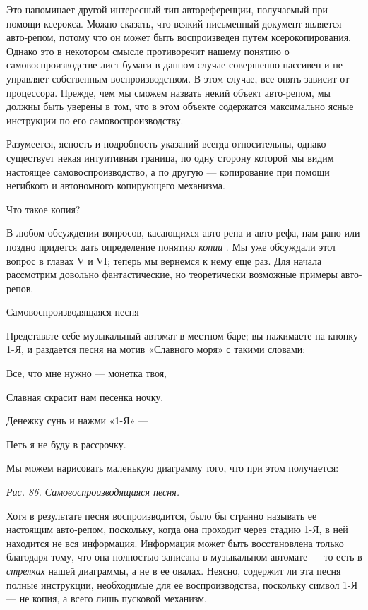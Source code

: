 Это напоминает другой интересный тип автореференции, получаемый при помощи ксерокса. Можно сказать, что всякий письменный документ является авто-репом, потому что он может быть воспроизведен путем ксерокопирования. Однако это в некотором смысле противоречит нашему понятию о самовоспроизводстве лист бумаги в данном случае совершенно пассивен и не управляет собственным воспроизводством. В этом случае, все опять зависит от процессора. Прежде, чем мы сможем назвать некий объект авто-репом, мы должны быть уверены в том, что в этом объекте содержатся максимально ясные инструкции по его самовоспроизводству.

Разумеется, ясность и подробность указаний всегда относительны, однако существует некая интуитивная граница, по одну сторону которой мы видим настоящее самовоспроизводство, а по другую --- копирование при помощи негибкого и автономного копирующего механизма.

Что такое копия?

В любом обсуждении вопросов, касающихся авто-репа и авто-рефа, нам рано или поздно придется дать определение понятию \emph{копии} . Мы уже обсуждали этот вопрос в главах V и VI; теперь мы вернемся к нему еще раз. Для начала рассмотрим довольно фантастические, но теоретически возможные примеры авто-репов.

Самовоспроизводящаяся песня

Представьте себе музыкальный автомат в местном баре; вы нажимаете на кнопку 1-Я, и раздается песня на мотив «Славного моря» с такими словами:

Все, что мне нужно --- монетка твоя,

Славная скрасит нам песенка ночку.

Денежку сунь и нажми «1-Я» ---

Петь я не буду в рассрочку.

Мы можем нарисовать маленькую диаграмму того, что при этом получается:

\emph{Рис. 86. Самовоспроизводящаяся песня.}

Хотя в результате песня воспроизводится, было бы странно называть ее настоящим авто-репом, поскольку, когда она проходит через стадию 1-Я, в ней находится не вся информация. Информация может быть восстановлена только благодаря тому, что она полностью записана в музыкальном автомате --- то есть в \emph{стрелках} нашей диаграммы, а не в ее овалах. Неясно, содержит ли эта песня полные инструкции, необходимые для ее воспроизводства, поскольку символ 1-Я --- не копия, а всего лишь пусковой механизм.

